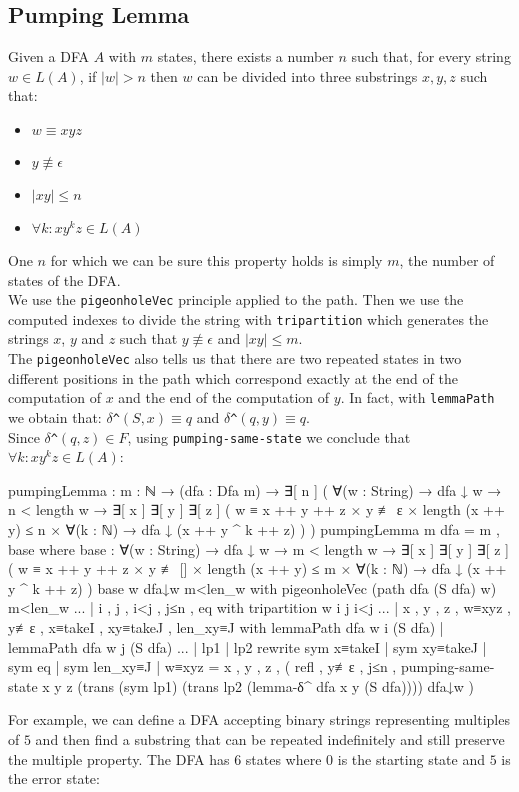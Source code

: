 \subsection{Pumping Lemma}
Given a DFA $A$ with $m$ states, there exists a number $n$ such that, for every string $w \in L(A)$, if $|w|>n$ then $w$ can be divided into three substrings $x,y,z$ such that:
\begin{itemize}
    \item $w \equiv xyz$
    \item $y \not \equiv \epsilon$
    \item $|xy| \leq n$
    \item $\forall k: xy^kz \in L(A)$
\end{itemize}
One $n$ for which we can be sure this property holds is simply $m$, the number of states of the DFA.\\
We use the \texttt{pigeonholeVec} principle applied to the path. Then we use the computed indexes to divide the string with \texttt{tripartition} which generates the strings $x$, $y$ and $z$ such that $y \not \equiv \epsilon$ and $|xy| \leq m$. \\
The \texttt{pigeonholeVec} also tells us that there are two repeated states in two different positions in the path which correspond exactly at the end of the computation of $x$ and the end of the computation of $y$. In fact, with \texttt{lemmaPath} we obtain that: $\delta$\texttt{\^}$(S, x) \equiv q$ and $\delta$\texttt{\^}$(q, y) \equiv q$.\\
Since $\delta$\texttt{\^}$(q, z) \in F$, using \texttt{pumping-same-state} we conclude that $\forall k: xy^kz \in L(A)$:
\begin{agda}
pumpingLemma : {m : ℕ}
  → (dfa : Dfa m)
  → ∃[ n ] (
    ∀(w : String)
    → dfa ↓ w
    → n < length w
    → ∃[ x ] ∃[ y ] ∃[ z ] (
        w ≡ x ++ y ++ z
        × y ≢ ε
        × length (x ++ y) ≤ n
        × ∀(k : ℕ) → dfa ↓ (x ++ y ^ k ++ z)
      )
  )
pumpingLemma {m} dfa = m , base
  where
  base : ∀(w : String)
    → dfa ↓ w
    → m < length w
    → ∃[ x ] ∃[ y ] ∃[ z ] (
        w ≡ x ++ y ++ z
        × y ≢ []
        × length (x ++ y) ≤ m
        × ∀(k : ℕ) → dfa ↓ (x ++ y ^ k ++ z)
      )
  base w dfa↓w m<len_w with
        pigeonholeVec (path dfa (S dfa) w) m<len_w
  ... | i , j , i<j , j≤n , eq  with
        tripartition w i j i<j
  ... | x , y , z , w≡xyz , y≢ε , x≡takeI , xy≡takeJ , len_xy≡J with
        lemmaPath dfa w i (S dfa) | lemmaPath dfa w j (S dfa)
  ... | lp1 | lp2 rewrite
        sym x≡takeI | sym xy≡takeJ | sym eq | sym len_xy≡J | w≡xyz =
    x , y , z , ( refl , y≢ε , j≤n
        , pumping-same-state x y z
            (trans (sym lp1) (trans lp2 (lemma-δ^ dfa x y (S dfa))))
            dfa↓w
      )
\end{agda}
For example, we can define a DFA accepting binary strings representing multiples of $5$ and then find a substring that can be repeated indefinitely and still preserve the multiple property. The DFA has $6$ states where $0$ is the starting state and $5$ is the error state:

